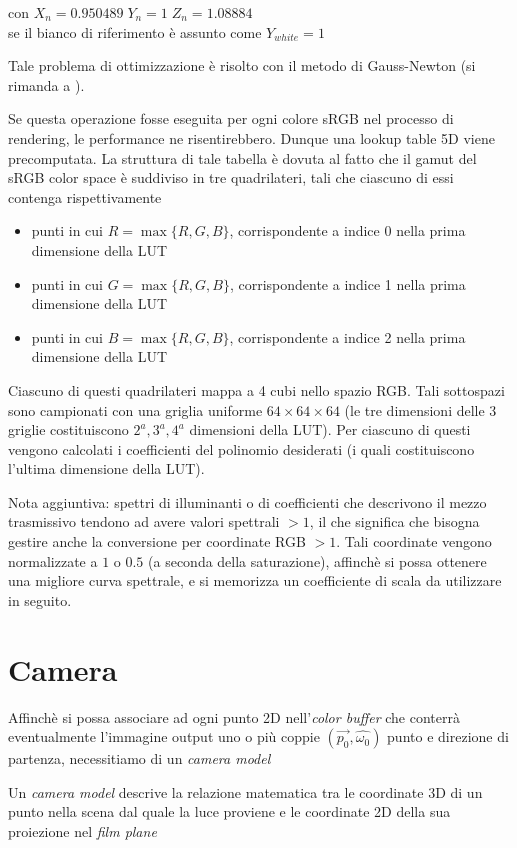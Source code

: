 \begin{center}
con $X_n = 0.950489\;Y_n = 1\; Z_n = 1.08884$\\
se il bianco di riferimento \`e assunto come $Y_{white} = 1$\par
\end{center}
Tale problema di ottimizzazione \`e risolto con il metodo di Gauss-Newton (si rimanda a \cite{pharr}).\par
Se questa operazione fosse eseguita per ogni colore sRGB nel processo di rendering, le performance ne risentirebbero. Dunque una lookup table 5D viene
precomputata. La struttura di tale tabella \`e dovuta al fatto che il gamut del sRGB color space \`e suddiviso in tre quadrilateri, tali che 
ciascuno di essi contenga rispettivamente 
\begin{itemize}[topsep=0pt, noitemsep]
	\item punti in cui $R = \max\{R, G, B\}$, corrispondente a indice 0 nella prima dimensione della LUT
	\item punti in cui $G = \max\{R, G, B\}$, corrispondente a indice 1 nella prima dimensione della LUT
	\item punti in cui $B = \max\{R, G, B\}$, corrispondente a indice 2 nella prima dimensione della LUT
\end{itemize}
Ciascuno di questi quadrilateri mappa a 4 cubi nello spazio RGB. Tali sottospazi sono campionati con una griglia uniforme 
$64\times 64\times64$ (le tre dimensioni 
delle 3 griglie costituiscono $2^a, 3^a, 4^a$ dimensioni della LUT). Per ciascuno di questi vengono calcolati i coefficienti del polinomio 
desiderati (i quali costituiscono l'ultima dimensione della LUT).\par
Nota aggiuntiva: spettri di illuminanti o di coefficienti che descrivono il mezzo trasmissivo tendono ad avere valori spettrali $>1$, il che significa
che bisogna gestire anche la conversione per coordinate RGB $>1$. Tali coordinate vengono normalizzate a $1$ o $0.5$ (a seconda della saturazione), 
affinch\`e si possa ottenere una migliore curva spettrale, e si memorizza un coefficiente di scala da utilizzare in seguito.
\section{Camera}\label{chapter2:camera}
Affinch\`e si possa associare ad ogni punto 2D nell'\textit{color buffer} che conterr\`a eventualmente l'immagine output uno o pi\`u coppie 
$(\vec{p_0}, \hat{\omega_0})$ punto e direzione di partenza, necessitiamo di un \textit{camera model}
\begin{definitionS}
	Un \textit{camera model} descrive la relazione matematica tra le coordinate 3D di un punto nella scena dal quale la luce proviene e le coordinate 
	2D della sua proiezione nel \textit{film plane}\footnotemark{} \cite{vision}
\end{definitionS}
